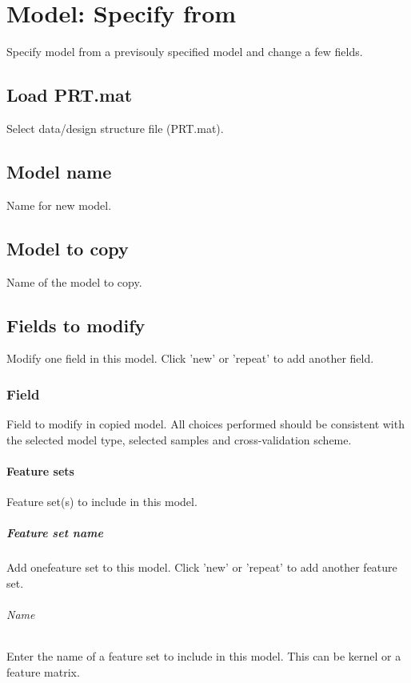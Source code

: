 
\chapter{Model: Specify from  \label{Chap:copymodel}}

\vskip 1.5cm

Specify model from a previsouly specified model and change a few fields.


\section{Load PRT.mat}
Select data/design structure file (PRT.mat).


\section{Model name}
Name for new model.


\section{Model to copy}
Name of the model to copy.


\section{Fields to modify}
Modify one field in this model. Click 'new' or 'repeat' to add another field.


\subsection{Field}
Field to modify in copied model. All choices performed should be consistent with the selected model type, selected samples and cross-validation scheme.


\subsubsection{Feature sets}
Feature set(s) to include in this model.


\paragraph{Feature set name}
Add onefeature set to this model. Click 'new' or 'repeat' to add another feature set.


\subparagraph{Name}
Enter the name of a feature set to include in this model. This can be kernel or a feature matrix. 


